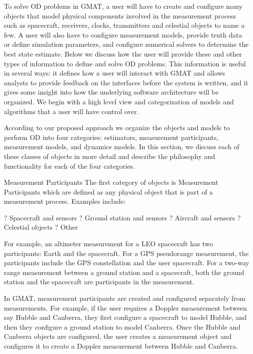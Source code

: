 To solve OD problems in GMAT, a user will have to create and
configure many objects that model physical components involved in
the measurement process such as spacecraft, receivers, clocks,
transmitters and celestial objects to name a few. A user will also
have to configure measurement models, provide truth data or define
simulation parameters, and configure numerical solvers to determine
the best state estimate. Below we discuss how the user will provide
these and other types of information to define and solve OD
problems. This information is useful in several ways: it defines how
a user will interact with GMAT and allows analysts to provide
feedback on the interfaces before the system is written, and it
gives some insight into how the underlying software architecture
will be organized.  We begin with a high level view and
categorization of models and algorithms that a user will have
control over.

According to our proposed approach we organize the objects and
models to perform OD into four categories:  estimators, measurement
participants, measurement models, and dynamics models.  In this
section, we discuss each of these classes of objects in more detail
and describe the philosophy and functionality for each of the four
categories.

Measurement Participants The first category of objects is
Measurement Participants which are defined as any physical object
that is part of a measurement process.  Examples include:

?   Spacecraft and sensors ?   Ground station and sensors ?
Aircraft and sensors ?   Celestial objects ?   Other

For example,  an altimeter measurement for a LEO spacecraft has two
participants: Earth and the spacecraft.  For a GPS pseudorange
measurement, the participants include the GPS constellation and the
user spacecraft.   For a two-way range measurement between a ground
station and a spacecraft, both the ground station and the spacecraft
are participants in the measurement.

In GMAT, measurement participants are created and configured
separately from measurements.  For example, if the user requires a
Doppler measurement between say Hubble and Canberra, they first
configure a spacecraft to model Hubble, and then they configure a
ground station to model Canberra.  Once the Hubble and Canberra
objects are configured, the user creates a measurement object and
configures it to create a Doppler measurement between Hubble and
Canberra.

